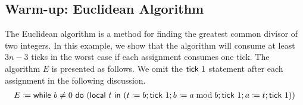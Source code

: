 \subsection{Warm-up: Euclidean Algorithm}
\label{sec:cs:euclid}

The Euclidean algorithm is a method for finding the greatest common divisor of two integers. In this example, we show that the algorithm will consume at least $3n-3$ ticks in the worst case if each assignment consumes one tick. The algorithm $E$ is presented as follows. We omit the $\textsf{tick}~1$ statement after each assignment in the following discussion.
\begin{align*}
  E\coloneqq \textsf{while}~b\ne 0~\textsf{do}~(\textsf{local}~t~\textsf{in}~(t\coloneqq b;\textsf{tick}~1;b\coloneqq a\bmod b;\textsf{tick}~1;a\coloneqq t;\textsf{tick}~1))
\end{align*}

